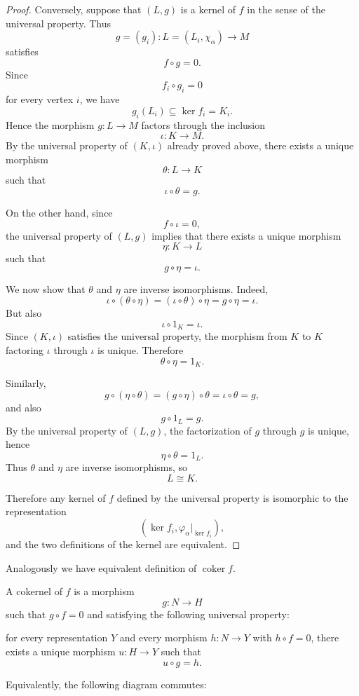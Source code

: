 \documentclass[11pt, a4paper]{report}
\begin{document}
\begin{proof}
    Conversely, suppose that $(L,g)$ is a kernel of $f$ in the sense of the
    universal property. Thus
    \[
        g=(g_i):L=(L_i,\chi_\alpha)\to M
    \]
    satisfies
    \[
        f\circ g=0.
    \]
    Since
    \[
        f_i\circ g_i=0
    \]
    for every vertex $i$, we have
    \[
        g_i(L_i)\subseteq \ker f_i=K_i.
    \]
    Hence the morphism $g:L\to M$ factors through the inclusion
    \[
        \iota:K\to M.
    \]
    By the universal property of $(K,\iota)$ already proved above, there exists a
    unique morphism
    \[
        \theta:L\to K
    \]
    such that
    \[
        \iota\circ \theta=g.
    \]

    On the other hand, since
    \[
        f\circ \iota=0,
    \]
    the universal property of $(L,g)$ implies that there exists a unique morphism
    \[
        \eta:K\to L
    \]
    such that
    \[
        g\circ \eta=\iota.
    \]

    We now show that $\theta$ and $\eta$ are inverse isomorphisms. Indeed,
    \[
        \iota\circ (\theta\circ \eta)
        =(\iota\circ \theta)\circ \eta
        =g\circ \eta
        =\iota.
    \]
    But also
    \[
        \iota\circ 1_K=\iota.
    \]
    Since $(K,\iota)$ satisfies the universal property, the morphism from $K$ to
    $K$ factoring $\iota$ through $\iota$ is unique. Therefore
    \[
        \theta\circ \eta=1_K.
    \]

    Similarly,
    \[
        g\circ (\eta\circ \theta)
        =(g\circ \eta)\circ \theta
        =\iota\circ \theta
        =g,
    \]
    and also
    \[
        g\circ 1_L=g.
    \]
    By the universal property of $(L,g)$, the factorization of $g$ through $g$ is
    unique, hence
    \[
        \eta\circ \theta=1_L.
    \]
    Thus $\theta$ and $\eta$ are inverse isomorphisms, so
    \[
        L\cong K.
    \]

    Therefore any kernel of $f$ defined by the universal property is isomorphic to
    the representation
    \[
        (\ker f_i,\varphi_\alpha|_{\ker f_i}),
    \]
    and the two definitions of the kernel are equivalent.
\end{proof}

Analogously we have equivalent definition of $\operatorname{coker}f$.

\begin{definition}
    A cokernel of $f$ is a morphism
    \[
        g:N\to H
    \]
    such that $g\circ f=0$ and satisfying the following universal property:

    for every representation $Y$ and every morphism $h:N\to Y$ with $h\circ f=0$,
    there exists a unique morphism $u:H\to Y$ such that
    \[
        u\circ g=h.
    \]

    Equivalently, the following diagram commutes:
    \begin{center}
    \end{center}
\end{definition}
\end{document}
